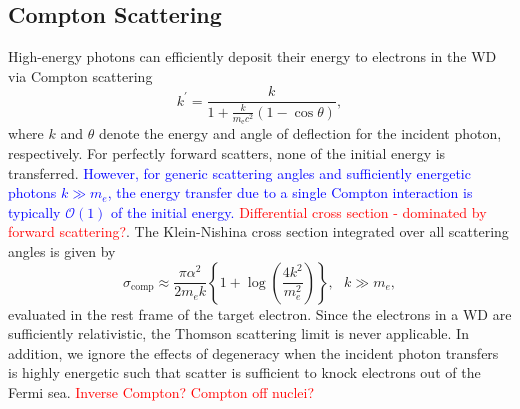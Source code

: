 \documentclass[twocolumn,showpacs,preprintnumbers,amsmath,amssymb,prd]{revtex4}
\newcommand{\OO}{\mathcal{O}}
\def\r{\right)}
\def\l{\left(}
\begin{document}
\begin{appendices}
\subsection*{Compton Scattering}
High-energy photons can efficiently deposit their energy to electrons in the WD via Compton scattering
\begin{equation}
{k^{\prime }={\frac {k}{1+{\frac {k}{m_{\text{e}}c^{2}}}(1-\cos \theta )}}},
\end{equation}
where $k$ and $\theta$ denote the energy and angle of deflection for the incident photon, respectively. For perfectly forward scatters, none of the initial energy is transferred. \textcolor{blue}{However, for generic scattering angles and sufficiently energetic photons $k \gg m_e$, the energy transfer due to a single Compton interaction is typically $\OO(1)$ of the initial energy.} \textcolor{red}{Differential cross section - dominated by forward scattering?}.
The Klein-Nishina cross section integrated over all scattering angles is given by
\begin{equation}
\sigma_\text{comp}\approx \frac{\pi \alpha^2}{2 m_e k} \left \{1+\log{\l\frac{4 k^2}{m_e^2} \r}\right \}, ~~~ k \gg m_e,
\end{equation}
evaluated in the rest frame of the target electron. Since the electrons in a WD are sufficiently relativistic, the Thomson scattering limit is never applicable. In addition, we ignore the effects of degeneracy when the incident photon transfers is highly energetic such that scatter is sufficient to knock electrons out of the Fermi sea.
\textcolor{red}{Inverse Compton? Compton off nuclei?}



\end{appendices}
\end{document}
